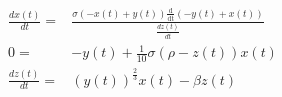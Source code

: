 \begin{align}
\frac{dx(t)}{dt} =& \frac{\sigma \left(  - x\left( t \right) + y\left( t \right) \right) \mathrm{\frac{d}{d t}}\left(  - y\left( t \right) + x\left( t \right) \right)}{\frac{dz(t)}{dt}} \\
0 =&  - y\left( t \right) + \frac{1}{10} \sigma \left( \rho - z\left( t \right) \right) x\left( t \right) \\
\frac{dz(t)}{dt} =& \left( y\left( t \right) \right)^{\frac{2}{3}} x\left( t \right) - \beta z\left( t \right)
\end{align}
